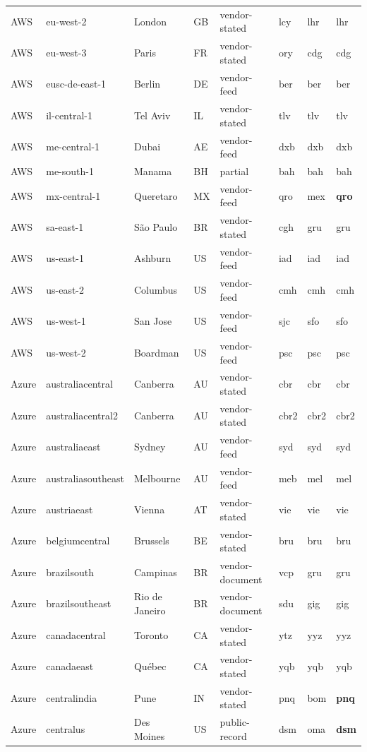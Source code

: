 \begin{longtable}{llllllll}
AWS & eu-west-2 & London & GB & vendor-stated & lcy & lhr & lhr \\
AWS & eu-west-3 & Paris & FR & vendor-stated & ory & cdg & cdg \\
AWS & eusc-de-east-1 & Berlin & DE & vendor-feed & ber & ber & ber \\
AWS & il-central-1 & Tel Aviv & IL & vendor-stated & tlv & tlv & tlv \\
AWS & me-central-1 & Dubai & AE & vendor-feed & dxb & dxb & dxb \\
AWS & me-south-1 & Manama & BH & partial & bah & bah & bah \\
AWS & mx-central-1 & Queretaro & MX & vendor-feed & qro & mex & \textbf{qro} \\
AWS & sa-east-1 & São Paulo & BR & vendor-stated & cgh & gru & gru \\
AWS & us-east-1 & Ashburn & US & vendor-feed & iad & iad & iad \\
AWS & us-east-2 & Columbus & US & vendor-feed & cmh & cmh & cmh \\
AWS & us-west-1 & San Jose & US & vendor-feed & sjc & sfo & sfo \\
AWS & us-west-2 & Boardman & US & vendor-feed & psc & psc & psc \\
Azure & australiacentral & Canberra & AU & vendor-stated & cbr & cbr & cbr \\
Azure & australiacentral2 & Canberra & AU & vendor-stated & cbr2 & cbr2 & cbr2 \\
Azure & australiaeast & Sydney & AU & vendor-feed & syd & syd & syd \\
Azure & australiasoutheast & Melbourne & AU & vendor-feed & meb & mel & mel \\
Azure & austriaeast & Vienna & AT & vendor-stated & vie & vie & vie \\
Azure & belgiumcentral & Brussels & BE & vendor-stated & bru & bru & bru \\
Azure & brazilsouth & Campinas & BR & vendor-document & vcp & gru & gru \\
Azure & brazilsoutheast & Rio de Janeiro & BR & vendor-document & sdu & gig & gig \\
Azure & canadacentral & Toronto & CA & vendor-stated & ytz & yyz & yyz \\
Azure & canadaeast & Québec & CA & vendor-stated & yqb & yqb & yqb \\
Azure & centralindia & Pune & IN & vendor-stated & pnq & bom & \textbf{pnq} \\
Azure & centralus & Des Moines & US & public-record & dsm & oma & \textbf{dsm} \\

\end{longtable}
